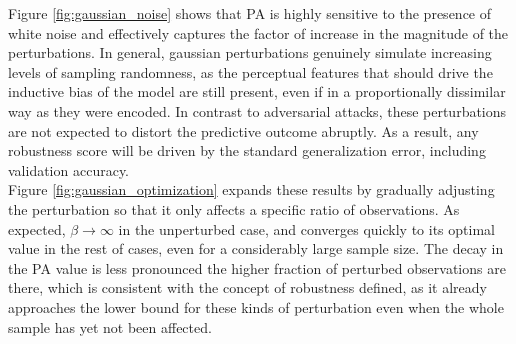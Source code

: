 Figure \ref{fig:gaussian_noise} shows that 
PA is highly sensitive to the presence of white noise and effectively captures the factor 
of increase in the magnitude of the perturbations. In general, gaussian perturbations genuinely simulate increasing levels of sampling randomness, as the 
perceptual features that should drive the inductive bias of the model are still present, even 
if in a proportionally dissimilar way as they were encoded. In contrast to adversarial attacks, 
these perturbations are not expected to distort the predictive outcome 
abruptly. As a result, any robustness score will be driven by the standard generalization error, including validation 
accuracy. \\

Figure \ref{fig:gaussian_optimization} expands these results by gradually adjusting
the perturbation so that it only affects a specific ratio of observations. As expected, 
$\beta \longrightarrow \infty$ in the unperturbed case, and converges
quickly to its optimal value in the rest of cases, even for a considerably large 
sample size. The decay in the PA value is less pronounced the higher
fraction of perturbed observations are there, which is consistent with the concept 
of robustness defined, as it already approaches the lower bound for these kinds of 
perturbation even when the whole sample has yet not been affected. \\



